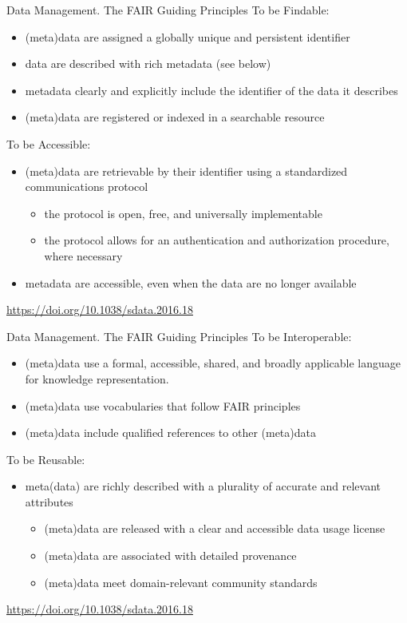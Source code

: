 \documentclass[ignorenonframetext,aspectratio=169,10pt,xcolor=table]{beamer}
\begin{document}
\begin{frame}{Data Management. The FAIR Guiding Principles}
To be Findable:
\begin{itemize}
\item (meta)data are assigned a globally unique and persistent identifier
\item data are described with rich metadata (see below)
\item metadata clearly and explicitly include the identifier of the data it describes
\item (meta)data are registered or indexed in a searchable resource
\end{itemize}

To be Accessible:
\begin{itemize}
\item (meta)data are retrievable by their identifier using a standardized communications protocol
\begin{itemize}
\item the protocol is open, free, and universally implementable
\item the protocol allows for an authentication and authorization procedure, where necessary
\end{itemize}
\item metadata are accessible, even when the data are no longer available
\end{itemize}

\begin{flushright}
{\tiny \url{https://doi.org/10.1038/sdata.2016.18}}
\end{flushright}
\end{frame}

\begin{frame}{Data Management. The FAIR Guiding Principles}
To be Interoperable:
\begin{itemize}
\item (meta)data use a formal, accessible, shared, and broadly applicable language for knowledge representation.
\item (meta)data use vocabularies that follow FAIR principles
\item (meta)data include qualified references to other (meta)data
\end{itemize}

To be Reusable:
\begin{itemize}
\item meta(data) are richly described with a plurality of accurate and relevant attributes
\begin{itemize}
\item (meta)data are released with a clear and accessible data usage license
\item (meta)data are associated with detailed provenance
\item (meta)data meet domain-relevant community standards
\end{itemize}
\end{itemize}

\begin{flushright}
{\tiny \url{https://doi.org/10.1038/sdata.2016.18}}
\end{flushright}

\end{frame}
\end{document}
